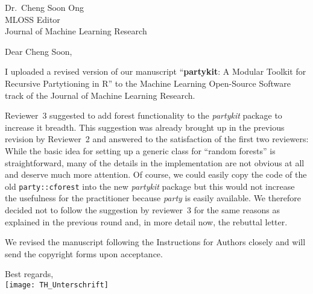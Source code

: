 \documentclass[ngerman,uzh]{scrlttr2}
\begin{document}

\begin{letter}{
Dr.~Cheng Soon Ong \\
MLOSS Editor \\
Journal of Machine Learning Research}

\subject{JMLR-14-133-3 revision}

\opening{Dear Cheng Soon,}

I uploaded a revised version of our manuscript
``\textbf{partykit}: A Modular Toolkit for Recursive Partytioning in R'' to the
Machine Learning Open-Source Software track of the Journal of Machine
Learning Research.

Reviewer~3 suggested to add forest functionality to the \emph{partykit}
package to increase it breadth.
This suggestion was already brought up in the previous revision by
Reviewer~2 and answered to the satisfaction of the first two reviewers:
While the basic idea for setting up a generic class for ``random forests''
is straightforward, many of the details in the implementation are not
obvious at all and deserve much more attention.  
Of course, we could easily copy the code of the old \texttt{party::cforest}
into the new \emph{partykit} package but this would not increase the
usefulness for the practitioner because \emph{party} is easily available. We
therefore decided not to follow the suggestion by reviewer~3 for the same
reasons as explained in the previous round and, in more detail now, the
rebuttal letter.

We revised the manuscript following the Instructions for Authors closely and
will send the copyright forms upon acceptance.

Best regards, \\
\texttt{[image: TH\_Unterschrift]}

\end{letter}
\end{document}
